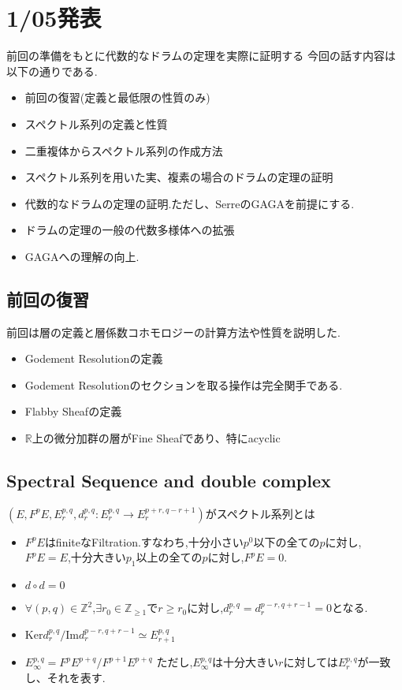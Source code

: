 

\chapter{1/05発表}
前回の準備をもとに代数的なドラムの定理を実際に証明する
今回の話す内容は以下の通りである.
\begin{itemize}
    \item 前回の復習(定義と最低限の性質のみ)
    \item スペクトル系列の定義と性質
    \item 二重複体からスペクトル系列の作成方法
    \item スペクトル系列を用いた実、複素の場合のドラムの定理の証明
    \item 代数的なドラムの定理の証明.ただし、SerreのGAGAを前提にする.
    \item ドラムの定理の一般の代数多様体への拡張
    \item GAGAへの理解の向上.
\end{itemize}

\section{前回の復習}
前回は層の定義と層係数コホモロジーの計算方法や性質を説明した.
\begin{itemize}
  \item Godement Resolutionの定義
  \item Godement Resolutionのセクションを取る操作は完全関手である.
  \item Flabby Sheafの定義
  \item $\mathbb{R}$上の微分加群の層がFine Sheafであり、特にacyclic
\end{itemize}


\section{Spectral Sequence and double complex}
\begin{dfn}
$(E, F^pE, E^{p,q}_r, d_r^{p,q}:E_r^{p,q} \to E_r^{p+r, q-r+1})$がスペクトル系列とは
\begin{itemize}
  \item $F^pE$はfiniteなFiltration.すなわち,十分小さい$p^0$以下の全ての$p$に対し,$F^pE =E$,十分大きい$p_1$以上の全ての$p$に対し,$F^pE=0$.
  \item $d \circ d = 0$
  \item $\forall (p,q) \in \mathbb{Z}^2$,$\exists r_0 \in \mathbb{Z}_{\ge 1}$で$r \ge r_0$に対し,$d_r^{p,q} = d_r^{p-r, q+r-1} = 0$となる.
  \item $\mathrm{Ker}d_r^{p,q}/ \mathrm{Im}d_r^{p-r,q+r-1} \simeq E_{r+1}^{p,q}$
  \item $E^{p,q}_{\infty} = F^pE^{p+q}/F^{p+1}E^{p+q}$
ただし,$E_{\infty}^{p,q}$は十分大きい$r$に対しては$E_r^{p,q}$が一致し、それを表す.
\end{itemize}
\end{dfn}

